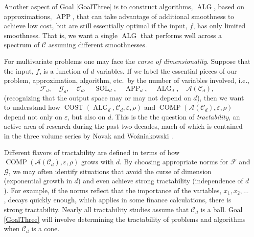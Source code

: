 \documentclass[11pt]{NSFamsart}
\DeclareMathOperator{\cost}{COST}
\DeclareMathOperator{\comp}{COMP}
\DeclareMathOperator{\SOL}{SOL}
\DeclareMathOperator{\APP}{APP}
\DeclareMathOperator{\ALG}{ALG}
\newcommand{\cc}{\mathcal{C}}
\newcommand{\cala}{{\mathcal{A}}}
\newcommand{\calc}{{\mathcal{C}}}
\newcommand{\calf}{{\mathcal{F}}}
\newcommand{\calg}{{\mathcal{G}}}
\begin{document}
Another aspect of Goal \ref{GoalThree} is to construct algorithms, $\ALG$, based on approximations, $\APP$, that can take advantage of additional smoothness to achieve low cost, but are still essentially optimal if the input, $f$, has only limited smoothness.  That is, we want a single $\ALG$ that performs well across a spectrum of  $\calc$ assuming different smoothnesses.

For multivariate problems one may face the \emph{curse of dimensionality}.  Suppose that the input, $f$, is a function of $d$ variables. If we label the essential pieces of our problem, approximation, algorithm, etc.\ by the number of variables involved, i.e., 
\begin{equation}
    \calf_d, \quad \calg_d, \quad \calc_d, \quad \SOL_d, \quad \APP_d,\quad \ALG_d, \quad \cala(\calc_d),
\end{equation}
(recognizing that the output space may or may not depend on $d$), then we want to understand how $\cost(\ALG_d, \calc_d, \varepsilon,\rho)$ and $\comp(\cala(\cc_d), \varepsilon,\rho)$ depend not only on $\varepsilon$, but also on $d$.  This is the the question of \emph{tractability}, an active area of research during the past two decades, much of which is contained in the three volume series by Novak and Wo\'zniakowski \cite{NovWoz08a,NovWoz10a,NovWoz12a}.

Different flavors of tractability are defined in terms of how  $\comp(\cala(\cc_d), \varepsilon,\rho)$ grows with $d$.  By choosing appropriate norms for $\calf$ and $\calg$, we may often identify situations that avoid the curse of dimension (exponential growth in $d$) and even achieve strong tractability (independence of $d$).   For example, if the norms reflect that the importance of the variables, $x_1, x_2, \ldots$, decays quickly enough, which applies in some finance calculations, there is strong tractability.  Nearly all tractability studies assume that $\calc_d$ is a ball.  Goal \ref{GoalThree} will involve determining the tractability of problems and algorithms when $\calc_d$ is a cone.
\end{document}
